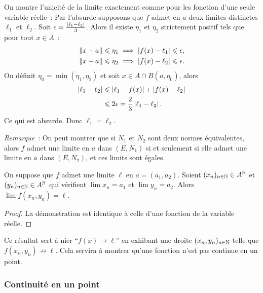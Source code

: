 On montre l'unicité de la limite exactement comme pour les fonction d'une seule variable réelle~: Par l'absurde supposons que \(f\) admet en \(a\) deux limites distinctes \(\ell_1\) et \(\ell_2\). Soit \(\epsilon = \frac{\left\lvert\ell_1 - \ell_2\right\rvert}{3}\). Alors il existe \(\eta_1\) et \(\eta_2\) strictement positif tels que pour tout \(x \in A\)~:
\begin{align}
  \left\lVert x-a\right\rVert \leqslant \eta_1 &\implies \left\lvert f(x)-\ell_1\right\rvert\leqslant \epsilon, \\
  \left\lVert x-a\right\rVert \leqslant \eta_2 &\implies \left\lvert f(x)-\ell_2\right\rvert\leqslant \epsilon.
\end{align}
On définit \(\eta_0=\min(\eta_1, \eta_2)\) et soit \(x \in A \cap B(a,\eta_0)\), alors
\begin{align}
  \left\lvert\ell_1-\ell_2\right\rvert &\leqslant \left\lvert\ell_1-f(x)\right\rvert + \left\lvert f(x)-\ell_2\right\rvert \\
  &\leqslant 2\epsilon = \frac{2}{3}\left\lvert\ell_1-\ell_2\right\rvert.
\end{align}
Ce qui est absurde. Donc \(\ell_1=\ell_2\).

\emph{Remarque}~: On peut montrer que si \(N_1\) et \(N_2\) sont deux normes équivalentes, alors \(f\) admet une limite en \(a\) dans \((E, N_1)\) si et seulement si elle admet une limite en \(a\) dans \((E, N_2)\), et ces limits sont égales.

\begin{prop}
  On suppose que \(f\) admet une limite \(\ell\) en \(a=(a_1, a_2)\). Soient \((x_n)_{n \in \mathbb{N}}\in A^{\mathbb{N}}\) et \((y_n)_{n \in \mathbb{N}}\in A^{\mathbb{N}}\) qui vérifient \(\lim x_n=a_1\) et \(\lim y_n=a_2\). Alors \(\lim f(x_n, y_n)=\ell\).
\end{prop}
\begin{proof}
  La démonstration est identique à celle d'une fonction de la variable réelle.
\end{proof}

Ce résultat sert à nier ``\(f(x) \to \ell\)'' en exhibant une droite \((x_n, y_n)_{n \in \mathbb{N}}\) telle que \(f(x_n, y_n) \not\to \ell\). Cela servira à montrer qu'une fonction n'est pas continue en un point.

\subsubsection{Continuité en un point}

